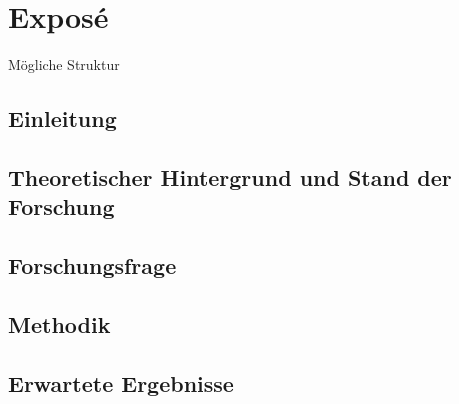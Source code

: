 \chapter{Exposé}

Mögliche Struktur

\section{Einleitung}

\section{Theoretischer Hintergrund und Stand der Forschung}

\section{Forschungsfrage}

\section{Methodik}

\section{Erwartete Ergebnisse}